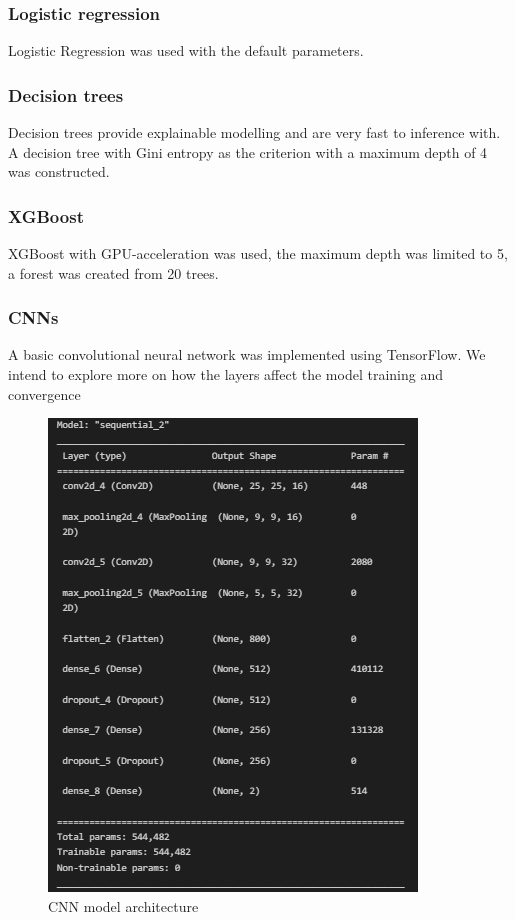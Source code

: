 \documentclass[10pt,twocolumn,letterpaper]{article}
\begin{document}
\subsubsection{Logistic regression}
Logistic Regression was used with the default parameters.

\subsubsection{Decision trees}
Decision trees provide explainable modelling and are very fast to inference with. A decision tree with Gini entropy as the criterion with a maximum depth of 4 was constructed.

\subsubsection{XGBoost}
XGBoost with GPU-acceleration was used, the maximum depth was limited to 5, a forest was created from 20 trees.

\subsubsection{CNNs}
A basic convolutional neural network was implemented using TensorFlow. We intend to explore more on how the layers affect the model training and convergence

\begin{figure}[t]
   \begin{center}
      \includegraphics[width=1\linewidth]{../Plots/model_specifications.png}
   \end{center}
      \caption{CNN model architecture}
   \label{fig:cnn_architecture}
\end{figure}
\end{document}
